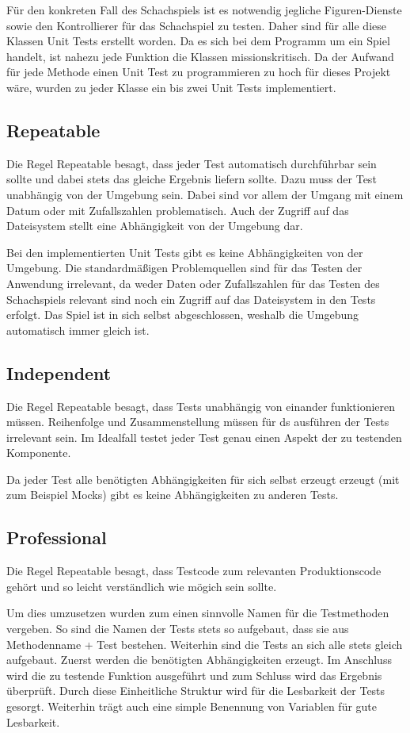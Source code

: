 Für den konkreten Fall des Schachspiels ist es notwendig jegliche Figuren-Dienste sowie den Kontrollierer für das Schachspiel zu testen. Daher sind für alle diese Klassen Unit Tests erstellt worden. Da es sich bei dem Programm um ein Spiel handelt, ist nahezu jede Funktion die Klassen missionskritisch. Da der Aufwand für jede Methode einen Unit Test zu programmieren zu hoch für dieses Projekt wäre, wurden zu jeder Klasse ein bis zwei Unit Tests implementiert.

\subsection{Repeatable}
Die Regel \glqq{}Repeatable\grqq{} besagt, dass jeder Test automatisch durchführbar sein sollte und dabei stets das gleiche Ergebnis liefern sollte. Dazu muss der Test unabhängig von der Umgebung sein. Dabei sind vor allem der Umgang mit einem Datum oder mit Zufallszahlen problematisch. Auch der Zugriff auf das Dateisystem stellt eine Abhängigkeit von der Umgebung dar.

Bei den implementierten Unit Tests gibt es keine Abhängigkeiten von der Umgebung. Die standardmäßigen Problemquellen sind für das Testen der Anwendung irrelevant, da weder Daten oder Zufallszahlen für das Testen des Schachspiels relevant sind noch ein Zugriff auf das Dateisystem in den Tests erfolgt. Das Spiel ist in sich selbst abgeschlossen, weshalb die Umgebung automatisch immer gleich ist.

\subsection{Independent}
Die Regel \glqq{}Repeatable\grqq{} besagt, dass Tests unabhängig von einander funktionieren müssen. Reihenfolge und Zusammenstellung müssen für ds ausführen der Tests irrelevant sein. Im Idealfall testet jeder Test genau einen Aspekt der zu testenden Komponente.

Da jeder Test alle benötigten Abhängigkeiten für sich selbst erzeugt erzeugt (mit zum Beispiel Mocks) gibt es keine Abhängigkeiten zu anderen Tests.

\subsection{Professional}
Die Regel \glqq{}Repeatable\grqq{} besagt, dass Testcode zum relevanten Produktionscode gehört und so leicht verständlich wie mögich sein sollte.

Um dies umzusetzen wurden zum einen sinnvolle Namen für die Testmethoden vergeben. So sind die Namen der Tests stets so aufgebaut, dass sie aus Methodenname + \glqq{}Test\grqq{} bestehen. Weiterhin sind die Tests an sich alle stets gleich aufgebaut. Zuerst werden die benötigten Abhängigkeiten erzeugt. Im Anschluss wird die zu testende Funktion ausgeführt und zum Schluss wird das Ergebnis überprüft. Durch diese Einheitliche Struktur wird für die Lesbarkeit der Tests gesorgt.  Weiterhin trägt auch eine simple Benennung von Variablen für gute Lesbarkeit.

